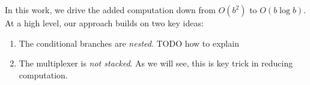 In this work, we drive the added computation down from $O(b^2)$ to
$O(b \log b)$.
At a high level, our approach builds on two key ideas:
\begin{enumerate}
  \item The conditional branches are \emph{nested}. TODO how to
    explain
  \item The multiplexer is \emph{not stacked}.
    As we will see, this is key trick in reducing computation.
\end{enumerate}


